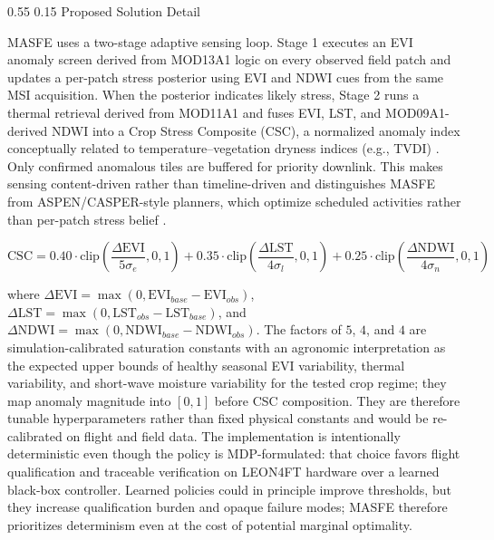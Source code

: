 \documentclass[11pt,letterpaper]{article}
\makeatletter
\renewcommand\section{\@startsection{section}{1}{\z@}
  {0.55\baselineskip}
  {0.15\baselineskip}
  {\normalfont\large\bfseries}}
\makeatother
\begin{document}
\section{Proposed Solution Detail}
\label{sec:solution}

MASFE uses a two-stage adaptive sensing loop. Stage 1 executes an EVI anomaly screen derived from MOD13A1 logic on every observed field patch and updates a per-patch stress posterior using EVI and NDWI cues from the same MSI acquisition. When the posterior indicates likely stress, Stage 2 runs a thermal retrieval derived from MOD11A1 and fuses EVI, LST, and MOD09A1-derived NDWI into a Crop Stress Composite (CSC), a normalized anomaly index conceptually related to temperature--vegetation dryness indices (e.g., TVDI) \cite{mod13a1,mod11a1,mod09a1,mod09-guide}. Only confirmed anomalous tiles are buffered for priority downlink. This makes sensing content-driven rather than timeline-driven and distinguishes MASFE from ASPEN/CASPER-style planners, which optimize scheduled activities rather than per-patch stress belief \cite{jpl-scheduling,eo1-autonomy}.

\begin{equation}
\text{CSC} = 0.40 \cdot \text{clip}\!\left(\frac{\Delta\text{EVI}}{5\sigma_e}, 0, 1\right)
           + 0.35 \cdot \text{clip}\!\left(\frac{\Delta\text{LST}}{4\sigma_l}, 0, 1\right)
           + 0.25 \cdot \text{clip}\!\left(\frac{\Delta\text{NDWI}}{4\sigma_n}, 0, 1\right)
\label{eq:csc}
\end{equation}

where $\Delta\text{EVI} = \max(0, \text{EVI}_{base} - \text{EVI}_{obs})$, $\Delta\text{LST} = \max(0, \text{LST}_{obs} - \text{LST}_{base})$, and $\Delta\text{NDWI} = \max(0, \text{NDWI}_{base} - \text{NDWI}_{obs})$.
The factors of $5$, $4$, and $4$ are simulation-calibrated saturation constants with an agronomic interpretation as the expected upper bounds of healthy seasonal EVI variability, thermal variability, and short-wave moisture variability for the tested crop regime; they map anomaly magnitude into $[0,1]$ before CSC composition. They are therefore tunable hyperparameters rather than fixed physical constants and would be re-calibrated on flight and field data. The implementation is intentionally deterministic even though the policy is MDP-formulated: that choice favors flight qualification and traceable verification on LEON4FT hardware over a learned black-box controller.
Learned policies could in principle improve thresholds, but they increase qualification burden and opaque failure modes; MASFE therefore prioritizes determinism even at the cost of potential marginal optimality.
\end{document}
